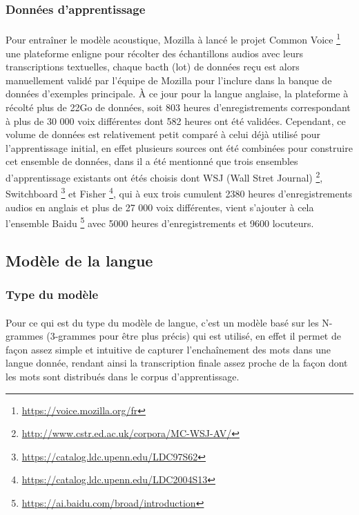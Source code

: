 		\subsubsection*{Données d'apprentissage}
		\paragraph{}
		Pour entraîner le modèle acoustique, Mozilla à lancé le projet Common Voice  \footnote{\url{https://voice.mozilla.org/fr}} une plateforme enligne pour récolter des échantillons audios avec leurs transcriptions textuelles, chaque bacth (lot) de données reçu est alors manuellement validé par l'équipe de Mozilla pour l'inclure dans la banque de données d'exemples principale. À ce jour pour la langue anglaise, la plateforme à récolté plus de 22Go de données, soit 803 heures d'enregistrements correspondant à plus de 30 000 voix différentes dont 582 heures ont été validées. Cependant, ce volume de données est relativement petit comparé à celui déjà utilisé pour l'apprentissage initial, en effet plusieurs sources ont été combinées pour construire cet ensemble de données, dans \cite{deepspeech_paper} il a été mentionné que trois ensembles d'apprentissage existants ont étés choisis dont WSJ (Wall Stret Journal) \footnote{\url{http://www.cstr.ed.ac.uk/corpora/MC-WSJ-AV/}}, Switchboard \footnote{\url{https://catalog.ldc.upenn.edu/LDC97S62}} et Fisher \footnote{\url{https://catalog.ldc.upenn.edu/LDC2004S13}}, qui à eux trois cumulent 2380 heures d'enregistrements audios en anglais et plus de 27 000 voix différentes, vient s'ajouter à cela l'ensemble Baidu \footnote{\url{https://ai.baidu.com/broad/introduction}} avec 5000 heures d'enregistrements et 9600 locuteurs.
		
	\subsection{Modèle de la langue}
		\subsubsection*{Type du modèle}
		\paragraph{}
		
		Pour ce qui est du type du modèle de langue, c'est un modèle basé sur les N-grammes (3-grammes pour être plus précis) qui est utilisé, en effet il permet de façon assez simple et intuitive de capturer l'enchaînement des mots dans une langue donnée, rendant ainsi la transcription finale assez proche de la façon dont les mots sont distribués dans le corpus d'apprentissage.
		
